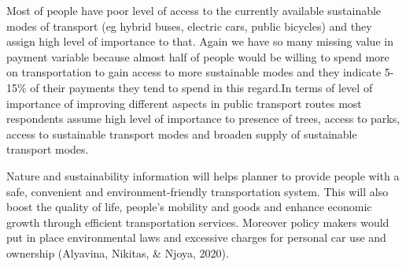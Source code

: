 \documentclass[
11pt, %
oneside, %
english, %
singlespacing, %
]{macthesis} %
\begin{document}
Most of people have poor level of access to the currently available sustainable modes of transport (eg hybrid buses, electric cars, public bicycles) and they assign high level of importance to that. Again we have so many missing value in payment variable because almost half of people would be willing to spend more on transportation to gain access to more sustainable modes and they indicate 5-15\% of their payments they tend to spend in this regard.In terms of level of importance of improving different aspects in public transport routes most respondents assume high level of importance to presence of trees, access to parks, access to sustainable transport modes and broaden supply of sustainable transport modes.

Nature and sustainability information will helps planner to provide people with a safe, convenient and environment-friendly transportation system. This will also boost the quality of life, people's mobility and goods and enhance economic growth through efficient transportation services. Moreover policy makers would put in place environmental laws and excessive charges for personal car use and ownership (Alyavina, Nikitas, \& Njoya, 2020).
\end{document}
